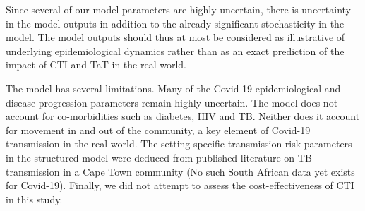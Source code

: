 \documentclass{article}
\begin{document}
Since several of our model parameters are highly uncertain, there is uncertainty
in the model outputs in addition to the already significant stochasticity in the
model. The model outputs should thus at most be considered as illustrative of
underlying epidemiological dynamics rather than as an exact prediction of the
impact of CTI and TaT in the real world.

The model has several limitations. Many of the Covid-19 epidemiological and
disease progression parameters remain highly uncertain. The model does not
account for co-morbidities such as diabetes, HIV and TB. Neither does it account
for movement in and out of the community, a key element of Covid-19 transmission
in the real world. The setting-specific transmission risk parameters in the
structured model were deduced from published literature on TB transmission in a
Cape Town community (No such South African data yet exists for
Covid-19). Finally, we did not attempt to assess the cost-effectiveness of CTI
in this study.
\end{document}
